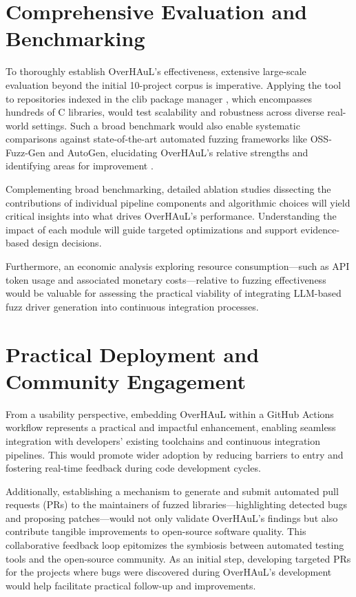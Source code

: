 \documentclass[
  a4paper,
  DIV=11,
  numbers=noendperiod]{scrreprt}
\theoremstyle{definition}
\theoremstyle{remark}
\begin{document}
\section{Comprehensive Evaluation and
Benchmarking}\label{comprehensive-evaluation-and-benchmarking}

To thoroughly establish OverHAuL's effectiveness, extensive large-scale
evaluation beyond the initial 10-project corpus is imperative. Applying
the tool to repositories indexed in the clib package manager
\autocite{clibs}, which encompasses hundreds of C libraries, would test
scalability and robustness across diverse real-world settings. Such a
broad benchmark would also enable systematic comparisons against
state-of-the-art automated fuzzing frameworks like OSS-Fuzz-Gen and
AutoGen, elucidating OverHAuL's relative strengths and identifying areas
for improvement \autocite{oss-fuzz-gen,sun2024}.

Complementing broad benchmarking, detailed ablation studies dissecting
the contributions of individual pipeline components and algorithmic
choices will yield critical insights into what drives OverHAuL's
performance. Understanding the impact of each module will guide targeted
optimizations and support evidence-based design decisions.

Furthermore, an economic analysis exploring resource consumption---such
as API token usage and associated monetary costs---relative to fuzzing
effectiveness would be valuable for assessing the practical viability of
integrating LLM-based fuzz driver generation into continuous integration
processes.

\section{Practical Deployment and Community
Engagement}\label{practical-deployment-and-community-engagement}

From a usability perspective, embedding OverHAuL within a GitHub Actions
workflow represents a practical and impactful enhancement, enabling
seamless integration with developers' existing toolchains and continuous
integration pipelines. This would promote wider adoption by reducing
barriers to entry and fostering real-time feedback during code
development cycles.

Additionally, establishing a mechanism to generate and submit automated
pull requests (PRs) to the maintainers of fuzzed
libraries---highlighting detected bugs and proposing patches---would not
only validate OverHAuL's findings but also contribute tangible
improvements to open-source software quality. This collaborative
feedback loop epitomizes the symbiosis between automated testing tools
and the open-source community. As an initial step, developing targeted
PRs for the projects where bugs were discovered during OverHAuL's
development would help facilitate practical follow-up and improvements.
\end{document}
